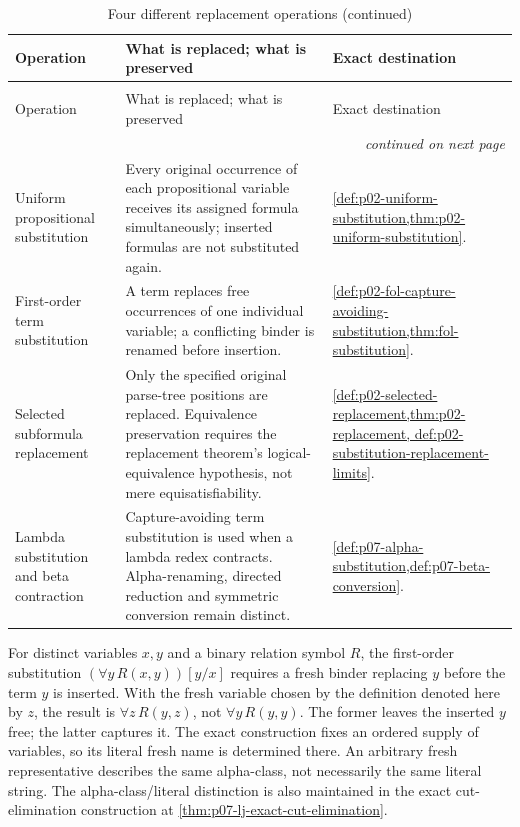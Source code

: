 \begin{longtable}{@{}p{}p{}p{}@{}}
\caption{Four different replacement operations}\\
\toprule
Operation & What is replaced; what is preserved & Exact destination \\
\midrule
\endfirsthead
\caption[]{Four different replacement operations (continued)}\\
\toprule
Operation & What is replaced; what is preserved & Exact destination \\
\midrule
\endhead
\midrule\multicolumn{3}{r}{\emph{continued on next page}}\\
\endfoot
\endlastfoot
Uniform propositional substitution & Every original occurrence of each
propositional variable receives its assigned formula simultaneously;
inserted formulas are not substituted again. &
\cref{def:p02-uniform-substitution,thm:p02-uniform-substitution}. \\
First-order term substitution & A term replaces free occurrences of one
individual variable; a conflicting binder is renamed before insertion. &
\cref{def:p02-fol-capture-avoiding-substitution,thm:fol-substitution}. \\
Selected subformula replacement & Only the specified original parse-tree
positions are replaced. Equivalence preservation requires the replacement
theorem's logical-equivalence hypothesis, not mere equisatisfiability. &
\cref{def:p02-selected-replacement,thm:p02-replacement,
def:p02-substitution-replacement-limits}. \\
Lambda substitution and beta contraction & Capture-avoiding term substitution
is used when a lambda redex contracts. Alpha-renaming, directed reduction and
symmetric conversion remain distinct. &
\cref{def:p07-alpha-substitution,def:p07-beta-conversion}. \\
\bottomrule
\end{longtable}

For distinct variables \(x,y\) and a binary relation symbol \(R\), the
first-order substitution \((\forall y\,R(x,y))[y/x]\) requires a fresh
binder replacing \(y\) before the term \(y\) is inserted. With the
fresh variable chosen by the definition denoted here by \(z\), the result
is \(\forall z\,R(y,z)\), not \(\forall y\,R(y,y)\).
The former leaves the inserted \(y\) free; the latter captures it.
The exact construction fixes an ordered supply of variables, so its literal
fresh name is determined there. An arbitrary fresh representative describes
the same alpha-class, not necessarily the same literal string.
The alpha-class/literal distinction is also maintained in the exact
cut-elimination construction at \cref{thm:p07-lj-exact-cut-elimination}.

